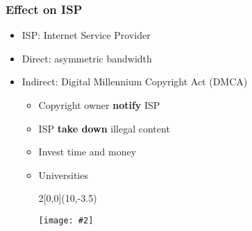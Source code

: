 \documentclass[mathserif,serif,14pt,aspectratio=169]{beamer}
\newcommand{\pic}[2]{
	\centerline{\texttt{[image: \#2]}}
}
\begin{document}
\begin{frame}
	\frametitle{Effect on ISP}
	\begin{itemize}\setlength\itemsep{0.5em}
	\item<1-> ISP: Internet Service Provider
	\item<2-> Direct: asymmetric bandwidth
	\item<3-> Indirect: Digital Millennium Copyright Act (DMCA)
		\begin{itemize}\setlength\itemsep{0.3em}
		\item<3-> Copyright owner \textbf{notify} ISP
		\item<3-> ISP \textbf{take down} illegal content
		\item<4-> Invest time and money
		\item<5-> Universities
		\begin{textblock}{2}[0,0](10,-3.5)
			\pic{0.15}{assets/ucd_dmca.png} \nocite{26_UCDavisDMCA}
		\end{textblock}
		
		\
		
		\
		
		\
		
		\end{itemize}
	\end{itemize}
\end{frame}
\end{document}
